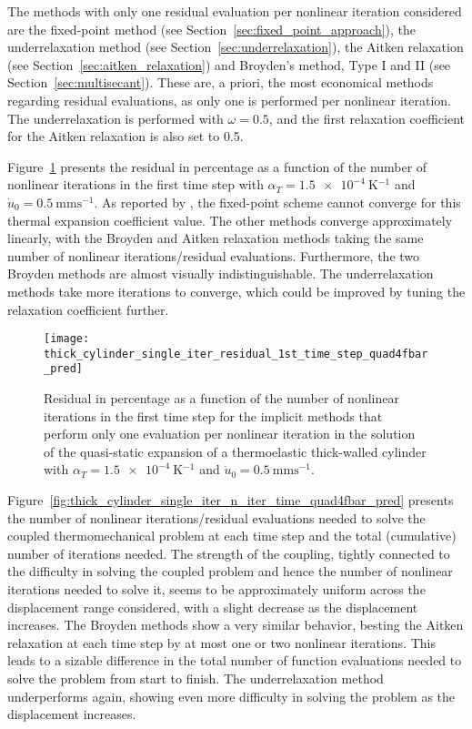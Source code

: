 The methods with only one residual evaluation per nonlinear iteration considered are the fixed-point method (see Section~\ref{sec:fixed_point_approach}), the underrelaxation method (see Section~\ref{sec:underrelaxation}), the Aitken relaxation (see Section~\ref{sec:aitken_relaxation}) and Broyden's method, Type I and II (see Section~\ref{sec:multisecant}).
These are, a priori, the most economical methods regarding residual evaluations, as only one is performed per nonlinear iteration.
The underrelaxation is performed with \(\omega = 0.5\), and the first relaxation coefficient for the Aitken relaxation is also set to 0.5.

Figure~\ref{fig:thick_cylinder_single_iter_residual_1st_time_step_quad4fbar_pred} presents the residual in percentage as a function of the number of nonlinear iterations in the first time step with \(\alpha_T=\SI{1.5e-4}{\kelvin^{-1}}\) and \(\dot u_0 =\SI{0.5}{\milli\meter\second^{-1}}\).
As reported by \cite{erbts_accelerated_2012}, the fixed-point scheme cannot converge for this thermal expansion coefficient value.
The other methods converge approximately linearly, with the Broyden and Aitken relaxation methods taking the same number of nonlinear iterations/residual evaluations.
Furthermore, the two Broyden methods are almost visually indistinguishable.
The underrelaxation methods take more iterations to converge, which
could be improved by tuning the relaxation coefficient further.

\begin{figure}[htbp]
 \centering
 \texttt{[image: thick\_cylinder\_single\_iter\_residual\_1st\_time\_step\_quad4fbar\_pred]}
 \caption{Residual in percentage as a function of the number of nonlinear iterations in the first time step for the implicit methods that perform only one evaluation per nonlinear iteration in the solution of the quasi-static expansion of a thermoelastic thick-walled cylinder with \(\alpha_T=\SI{1.5e-4}{\kelvin^{-1}}\) and \(\dot u_0 =\SI{0.5}{\milli\meter\second^{-1}}\). }
\label{fig:thick_cylinder_single_iter_residual_1st_time_step_quad4fbar_pred}
\end{figure}

Figure~\ref{fig:thick_cylinder_single_iter_n_iter_time_quad4fbar_pred} presents the number of nonlinear iterations/residual evaluations needed to solve the coupled thermomechanical problem at each time step and the total (cumulative) number of iterations needed.
The strength of the coupling, tightly connected to the difficulty in solving the coupled problem and hence the number of nonlinear iterations needed to solve it, seems to be approximately uniform across the displacement range considered, with a slight decrease as the displacement increases.
The Broyden methods show a very similar behavior, besting the Aitken relaxation at each time step by at most one or two nonlinear iterations.
This leads to a sizable difference in the total number of function evaluations needed to solve the problem from start to finish.
The underrelaxation method underperforms again, showing even more difficulty in solving the problem as the displacement increases.

